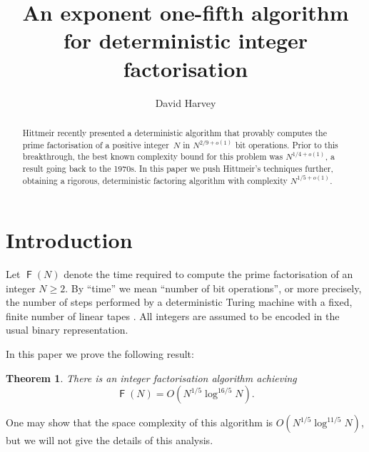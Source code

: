 \documentclass[reqno]{amsart}
\newtheorem{thm}{Theorem}
\theoremstyle{remark}
\numberwithin{equation}{section}
\numberwithin{thm}{section}
\DeclareMathOperator{\FF}{\mathsf{F}}
\renewcommand{\geq}{\geqslant}
\begin{document}
\title[Exponent one-fifth integer factorisation]{An exponent one-fifth algorithm for deterministic integer factorisation}
\author{David Harvey}
\address{School of Mathematics and Statistics, University of New South Wales, Sydney NSW 2052, Australia}

\begin{abstract}
Hittmeir recently presented a deterministic algorithm that provably computes
the prime factorisation of a positive integer~$N$
in $N^{2/9+o(1)}$ bit operations.
Prior to this breakthrough, the best known complexity bound
for this problem was $N^{1/4+o(1)}$,
a result going back to the 1970s.
In this paper we push Hittmeir's techniques further,
obtaining a rigorous, deterministic factoring algorithm
with complexity $N^{1/5+o(1)}$.
\end{abstract}

\maketitle


\section{Introduction}
\label{sec:intro}

Let $\FF(N)$ denote the time required to compute the prime factorisation
of an integer $N \geq 2$.
By ``time'' we mean ``number of bit operations'',
or more precisely, the number of steps performed by a deterministic
Turing machine with a fixed, finite number of linear tapes
\cite{Pap-complexity}.
All integers are assumed to be encoded in the usual binary representation.

In this paper we prove the following result:
\begin{thm}
\label{thm:main}
  There is an integer factorisation algorithm achieving
    \[ \FF(N) = O(N^{1/5} \log^{16/5} N). \]
\end{thm}
One may show that the space complexity of this algorithm is
$O(N^{1/5} \log^{11/5} N)$,
but we will not give the details of this analysis.
\end{document}
